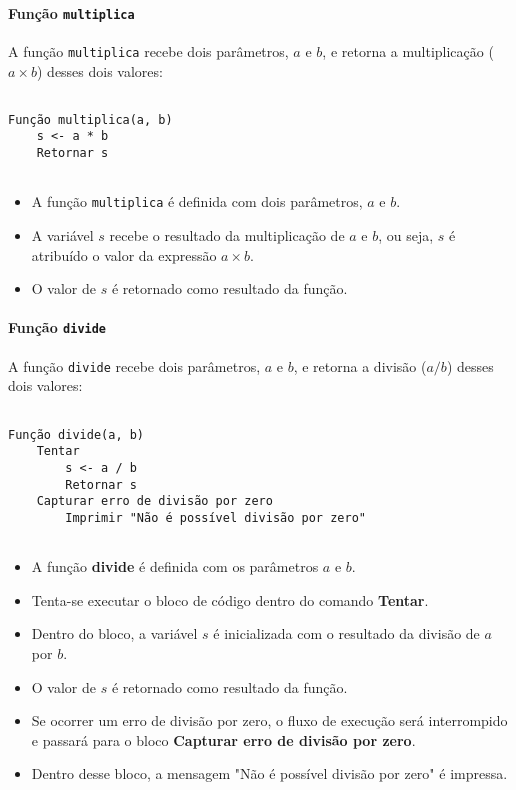 \documentclass[a4paper, 12pt, onecolumn,singlespacing]{article}
\begin{document}
\paragraph{Função \texttt{multiplica}} A função \texttt{multiplica} recebe dois parâmetros, $a$ e $b$, e retorna a multiplicação ($a \times b$) desses dois valores:


\begin{verbatim}
	
Função multiplica(a, b)
	s <- a * b
	Retornar s
	
\end{verbatim}

\begin{itemize}
	\item A função \texttt{multiplica} é definida com dois parâmetros, $a$ e $b$.
	\item A variável $s$ recebe o resultado da multiplicação de $a$ e $b$, ou seja, $s$ é atribuído o valor da expressão $a \times b$.
	\item O valor de $s$ é retornado como resultado da função.
\end{itemize}

\paragraph{Função \texttt{divide}} A função \texttt{divide} recebe dois parâmetros, $a$ e $b$, e retorna a divisão ($a/b$) desses dois valores:

\begin{verbatim}
	
Função divide(a, b)
	Tentar
		s <- a / b
		Retornar s
	Capturar erro de divisão por zero
		Imprimir "Não é possível divisão por zero"
	
\end{verbatim}

\begin{itemize}
	\item A função \textbf{divide} é definida com os parâmetros $a$ e $b$.
	\item Tenta-se executar o bloco de código dentro do comando \textbf{Tentar}.
	\item Dentro do bloco, a variável $s$ é inicializada com o resultado da divisão de $a$ por $b$.
	\item O valor de $s$ é retornado como resultado da função.
	\item Se ocorrer um erro de divisão por zero, o fluxo de execução será interrompido e passará para o bloco \textbf{Capturar erro de divisão por zero}.
	\item Dentro desse bloco, a mensagem "Não é possível divisão por zero" é impressa.
\end{itemize}
\end{document}
